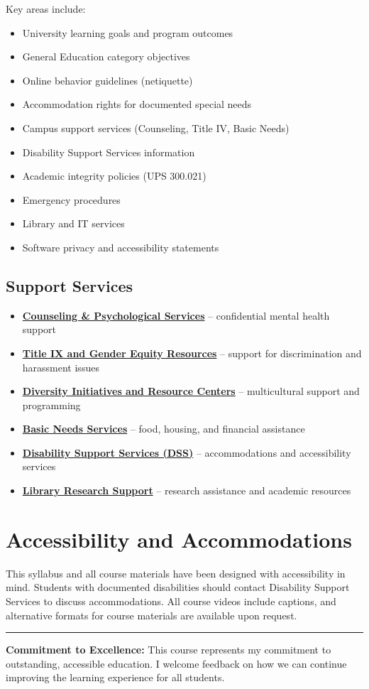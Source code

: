 \documentclass[11pt]{scrartcl} %
\begin{document}
Key areas include:
\begin{itemize}
\item University learning goals and program outcomes
\item General Education category objectives
\item Online behavior guidelines (netiquette)
\item Accommodation rights for documented special needs
\item Campus support services (Counseling, Title IV, Basic Needs)
\item Disability Support Services information
\item Academic integrity policies (UPS 300.021)
\item Emergency procedures
\item Library and IT services
\item Software privacy and accessibility statements
\end{itemize}

\subsection{Support Services}
\begin{itemize}
\item \textbf{\href{https://www.fullerton.edu/caps/}{Counseling \& Psychological Services}} -- confidential mental health support
\item \textbf{\href{https://www.fullerton.edu/titleix/}{Title IX and Gender Equity Resources}} -- support for discrimination and harassment issues
\item \textbf{\href{https://www.fullerton.edu/dirc/}{Diversity Initiatives and Resource Centers}} -- multicultural support and programming
\item \textbf{\href{https://www.fullerton.edu/basicneeds/}{Basic Needs Services}} -- food, housing, and financial assistance
\item \textbf{\href{https://www.fullerton.edu/dss/}{Disability Support Services (DSS)}} -- accommodations and accessibility services
\item \textbf{\href{https://www.library.fullerton.edu/}{Library Research Support}} -- research assistance and academic resources
\end{itemize}


\section{Accessibility and Accommodations}

This syllabus and all course materials have been designed with accessibility in mind. Students with documented disabilities should contact Disability Support Services to discuss accommodations. All course videos include captions, and alternative formats for course materials are available upon request.

\vspace{1em}
\hrule
\vspace{0.5em}
\textbf{Commitment to Excellence:} This course represents my commitment to outstanding, accessible education. I welcome feedback on how we can continue improving the learning experience for all students.
\end{document}
